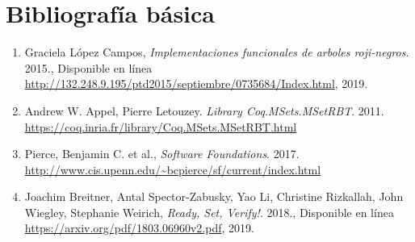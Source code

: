 \documentclass[letterpaper, 11pt]{article}
\begin{document}
\section*{Bibliografía básica}
\begin{enumerate}
  \item Graciela L\'opez Campos, \emph{Implementaciones funcionales de arboles roji-negros}. 2015., 
Disponible en l\'inea \url{	http://132.248.9.195/ptd2015/septiembre/0735684/Index.html}, 2019.
  \item  Andrew W. Appel, Pierre Letouzey. \emph{Library Coq.MSets.MSetRBT}. 2011. \url{https://coq.inria.fr/library/Coq.MSets.MSetRBT.html}
  \item Pierce, Benjamin C. et al., \emph{Software Foundations}. 2017. \url{http://www.cis.upenn.edu/~bcpierce/sf/current/index.html} 
  \item Joachim Breitner, Antal Spector-Zabusky, Yao Li, Christine Rizkallah, John Wiegley, Stephanie Weirich, \emph{Ready, Set, Verify!}. 2018., 
Disponible en l\'inea \url{	https://arxiv.org/pdf/1803.06960v2.pdf}, 2019.
\end{enumerate}
\end{document}
